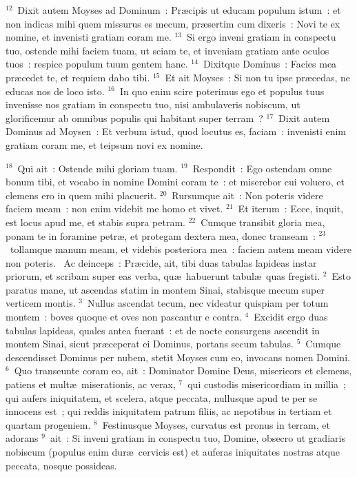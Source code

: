 ${}^{12}$~Dixit autem Moyses ad Dominum~: Pr\ae cipis ut educam populum istum~: et non indicas mihi quem missurus es mecum, pr\ae sertim cum dixeris~: Novi te ex nomine, et invenisti gratiam coram me.
${}^{13}$~Si ergo inveni gratiam in conspectu tuo, ostende mihi faciem tuam, ut sciam te, et inveniam gratiam ante oculos tuos~: respice populum tuum gentem hanc.
${}^{14}$~Dixitque Dominus~: Facies mea pr\ae cedet te, et requiem dabo tibi.
${}^{15}$~Et ait Moyses~: Si non tu ipse pr\ae cedas, ne educas nos de loco isto.
${}^{16}$~In quo enim scire poterimus ego et populus tuus invenisse nos gratiam in conspectu tuo, nisi ambulaveris nobiscum, ut glorificemur ab omnibus populis qui habitant super terram~?
${}^{17}$~Dixit autem Dominus ad Moysen~: Et verbum istud, quod locutus es, faciam~: invenisti enim gratiam coram me, et teipsum novi ex nomine.


${}^{18}$~Qui ait~: Ostende mihi gloriam tuam.
${}^{19}$~Respondit~: Ego ostendam omne bonum tibi, et vocabo in nomine Domini coram te~: et miserebor cui voluero, et clemens ero in quem mihi placuerit.
${}^{20}$~Rursumque ait~: Non poteris videre faciem meam~: non enim videbit me homo et vivet.
${}^{21}$~Et iterum~: Ecce, inquit, est locus apud me, et stabis supra petram.
${}^{22}$~Cumque transibit gloria mea, ponam te in foramine petr\ae , et protegam dextera mea, donec transeam~:
${}^{23}$~tollamque manum meam, et videbis posteriora mea~: faciem autem meam videre non poteris.
~\lettrine[lines=10,image=true,loversize=0.05,lraise=-0.03]{A}{}c deinceps~: Pr\ae cide, ait, tibi duas tabulas lapideas instar priorum, et scribam super eas verba, qu\ae\ habuerunt tabul\ae\ quas fregisti.
${}^{2}$~Esto paratus mane, ut ascendas statim in montem Sinai, stabisque mecum super verticem montis.
${}^{3}$~Nullus ascendat tecum, nec videatur quispiam per totum montem~: boves quoque et oves non pascantur e contra.
${}^{4}$~Excidit ergo duas tabulas lapideas, quales antea fuerant~: et de nocte consurgens ascendit in montem Sinai, sicut pr\ae ceperat ei Dominus, portans secum tabulas.
${}^{5}$~Cumque descendisset Dominus per nubem, stetit Moyses cum eo, invocans nomen Domini.
${}^{6}$~Quo transeunte coram eo, ait~: Dominator Domine Deus, misericors et clemens, patiens et mult\ae\ miserationis, ac verax,
${}^{7}$~qui custodis misericordiam in millia~; qui aufers iniquitatem, et scelera, atque peccata, nullusque apud te per se innocens est~; qui reddis iniquitatem patrum filiis, ac nepotibus in tertiam et quartam progeniem.
${}^{8}$~Festinusque Moyses, curvatus est pronus in terram, et adorans
${}^{9}$~ait~: Si inveni gratiam in conspectu tuo, Domine, obsecro ut gradiaris nobiscum (populus enim dur\ae\ cervicis est) et auferas iniquitates nostras atque peccata, nosque possideas.


